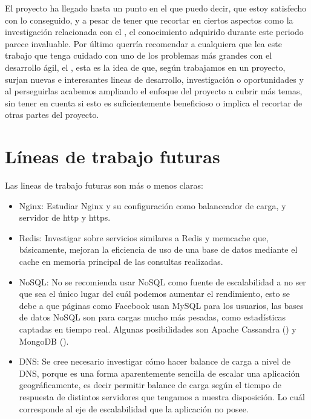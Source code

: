 El proyecto ha llegado hasta un punto en el que puedo decir, que estoy satisfecho con lo conseguido, y a pesar de tener que recortar en ciertos aspectos como la investigación relacionada con el , el conocimiento adquirido durante este periodo parece invaluable. Por último querría recomendar a cualquiera que lea este trabajo que tenga cuidado con uno de los problemas más grandes con el desarrollo ágil, el , esta es la idea de que, según trabajamos en un proyecto, surjan nuevas e interesantes lineas de desarrollo, investigación o oportunidades y al perseguirlas acabemos ampliando el enfoque del proyecto a cubrir más temas, sin tener en cuenta si esto es suficientemente beneficioso o implica el recortar de otras partes del proyecto.
 

\section{Líneas de trabajo futuras}
Las lineas de trabajo futuras son más o menos claras:

\begin{itemize}
\item Nginx: Estudiar Nginx y su configuración como balanceador de carga,  y servidor de http y https. 
\item Redis: Investigar sobre servicios similares a Redis y memcache que, básicamente, mejoran la eficiencia de uso de una base de datos mediante el cache en memoria principal de las consultas realizadas.
\item NoSQL: No se recomienda usar NoSQL como fuente de escalabilidad a no ser que sea el único lugar del cuál podemos aumentar el rendimiento, esto se debe a que páginas como Facebook usan MySQL para los usuarios, las bases de datos NoSQL son para cargas mucho más pesadas, como estadísticas captadas en tiempo real. Algunas posibilidades son Apache Cassandra () y MongoDB ().
\item DNS: Se cree necesario investigar cómo hacer balance de carga a nivel de DNS, porque es una forma aparentemente sencilla de escalar una aplicación geográficamente, es decir permitir balance de carga según el tiempo de respuesta de distintos servidores que tengamos a nuestra disposición. Lo cuál corresponde al eje de escalabilidad que la aplicación no posee.
\end{itemize}

